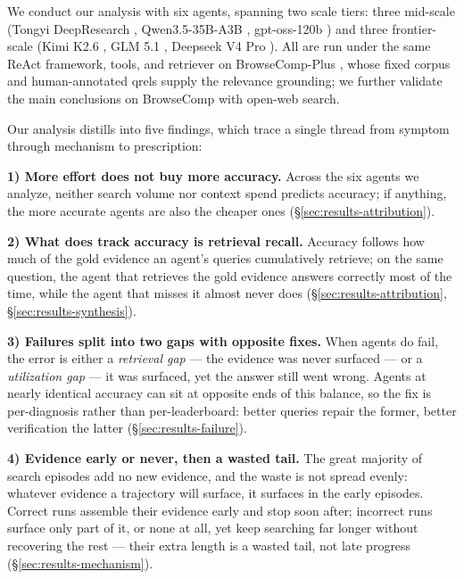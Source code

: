 We conduct our analysis with six agents, spanning two scale tiers: three mid-scale (Tongyi DeepResearch \citep{Team2025TongyiDeepResearchTechnical}, Qwen3.5-35B-A3B \citep{qwen2025qwen3}, gpt-oss-120b \citep{openai2025gptoss}) and three frontier-scale (Kimi K2.6 \citep{kimi2026k26}, GLM 5.1 \citep{zeng2026glm}, Deepseek V4 Pro \citep{deepseekai2026deepseekv4}). All are run under the same ReAct framework, tools, and retriever on BrowseComp-Plus \citep{Chen2025BrowseComp-PlusAMore}, whose fixed corpus and human-annotated qrels supply the relevance grounding; we further validate the main conclusions on BrowseComp \citep{Wei2025BrowseCompASimple} with open-web search.

Our analysis distills into five findings, which trace a single thread from symptom through mechanism to prescription: 

\textbf{1) More effort does not buy more accuracy.} Across the six agents we analyze, neither search volume nor context spend predicts accuracy; if anything, the more accurate agents are also the cheaper ones (§\ref{sec:results-attribution}).

\textbf{2) What does track accuracy is retrieval recall.} Accuracy follows how much of the gold evidence an agent's queries cumulatively retrieve; on the same question, the agent that retrieves the gold evidence answers correctly most of the time, while the agent that misses it almost never does (§\ref{sec:results-attribution}, §\ref{sec:results-synthesis}).

\textbf{3) Failures split into two gaps with opposite fixes.} When agents do fail, the error is either a \emph{retrieval gap} --- the evidence was never surfaced --- or a \emph{utilization gap} --- it was surfaced, yet the answer still went wrong. Agents at nearly identical accuracy can sit at opposite ends of this balance, so the fix is per-diagnosis rather than per-leaderboard: better queries repair the former, better verification the latter (§\ref{sec:results-failure}).

\textbf{4) Evidence early or never, then a wasted tail.} The great majority of search episodes add no new evidence, and the waste is not spread evenly: whatever evidence a trajectory will surface, it surfaces in the early episodes. Correct runs assemble their evidence early and stop soon after; incorrect runs surface only part of it, or none at all, yet keep searching far longer without recovering the rest --- their extra length is a wasted tail, not late progress (§\ref{sec:results-mechanism}).

